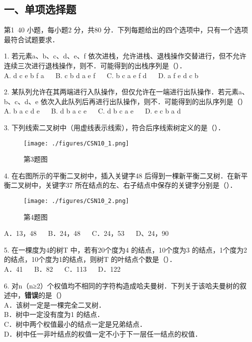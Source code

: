 
\subsection{一、单项选择题}
第1~40 小题，每小题2 分，共80 分．下列每题给出的四个选项中，只有一个选项最符合试题要求．

1. 若元素a、b、c、d、e、f 依次进栈，允许进栈、退栈操作交替进行，但不允许连续三次进行退栈操作，则不．可能得到的出栈序列是（）． \\
A. d c e b f a $\quad$ B. c b d a e f $\quad$ C. b c a e f d $\quad$ D. a f e d c b

2. 某队列允许在其两端进行入队操作，但仅允许在一端进行出队操作．若元素a、b、c、d、e 依次入此队列后再进行出队操作，则不．可能得到的出队序列是（） \\
A. b a c d e $\quad$ B. d b a c e $\quad$ C. d b c a e $\quad$ D. e c b a d

3. 下列线索二叉树中（用虚线表示线索），符合后序线索树定义的是（）．\\
\begin{figure}[ht]
\centering
\texttt{[image: ./figures/CSN10\_1.png]}
\caption{第3题图} \label{CSN10_fig1}
\end{figure}

4. 在右图所示的平衡二叉树中，插入关键字48 后得到一棵新平衡二叉树．在新平衡二叉树中，关键字37 所在结点的左、右子结点中保存的关键字分别是（）． \\
\begin{figure}[ht]
\centering
\texttt{[image: ./figures/CSN10\_2.png]}
\caption{第4题图} \label{CSN10_fig2}
\end{figure}
A．13，48 $\quad$ B．24，48 $\quad$ C．24，53 $\quad$ D、24，90

5. 在一棵度为4的树T 中，若有20个度为4 的结点，10个度为3 的结点，1个度为2 的结点，10个度为1的结点，则树T 的叶结点个数是（）． \\
A．41 $\quad$ B．82 $\quad$ C．113 $\quad$ D．122

6. 对n（n≥2）个权值均不相同的字符构造成哈夫曼树．下列关于该哈夫曼树的叙述中，\textbf{错误}的是（） \\
A．该树一定是一棵完全二叉树． \\
B．树中一定没有度为1 的结点． \\
C．树中两个权值最小的结点一定是兄弟结点． \\
D．树中任一非叶结点的权值一定不小于下一层任一结点的权值．

